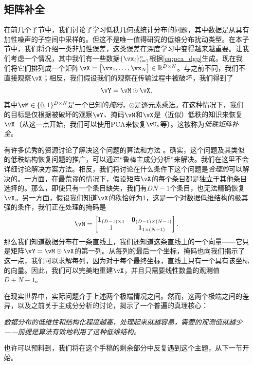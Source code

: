 \documentclass[../../book-main_zh.tex]{subfiles}
\begin{document}
\subsection{矩阵补全}

在前几个子节中，我们讨论了学习低秩几何或统计分布的问题，其中数据是从具有加性噪声的子空间中采样的。但这不是唯一值得研究的低维分布扰动类型。在本子节中，我们将介绍一类非加性误差，这类误差在深度学习中变得越来越重要。让我们考虑一个情况，其中我们有一些数据\(\{\vx_{i}\}_{i = 1}^{n}\)根据\eqref{eq:pca_dgp}生成。现在我们将它们排列成一个矩阵\(\vX = \mat{\vx_{1}, \dots, \vx_{N}} \in \R^{D \times N}\)。与之前不同，我们不直接观察\(\vX\)；相反，我们假设我们的观察在传输过程中被破坏，我们得到了
\begin{equation}
    \vY = \vM \odot \vX,
\end{equation}
其中\(\vM \in \{0, 1\}^{D \times N}\)是一个已知的\textit{掩码}，\(\odot\)是逐元素乘法。在这种情况下，我们的目标是仅根据被破坏的观察\(\vY\)、掩码\(\vM\)和\(\vX\)是（近似）低秩的知识来恢复\(\vX\)（从这一点开始，我们可以使用PCA来恢复\(\vU_{o}\)等）。这被称为\textit{低秩矩阵补全}。

有许多优秀的资源讨论了解决这个问题的算法和方法 \cite{Wright-Ma-2022}。确实，这个问题及其类似的低秩结构恢复问题的推广，可以通过“鲁棒主成分分析”来解决。我们在这里不会详细讨论解决方案方法。相反，我们将讨论在什么条件下这个问题是\textit{合理的}可以解决的。一方面，在最荒谬的情况下，假设矩阵\(\vX\)的每个条目都是独立于其他条目选择的。那么，即使只有一个条目缺失，我们有\(DN - 1\)个条目，也无法精确恢复\(\vX\)。另一方面，假设我们知道\(\vX\)的秩恰好为1，这是一个对数据低维结构的极其强的条件，我们正在处理的掩码是
\begin{equation}
    \vM = \mat{\vone_{(D - 1) \times 1} & \vzero_{(D - 1) \times (N - 1)} \\ 1 & \vone_{1 \times (N - 1)} }.
\end{equation}
那么我们知道数据分布在一条直线上，我们还知道这条直线上的一个向量——它只是矩阵\(\vY = \vM \odot \vX\)的第一列。从每列的最后一个坐标，掩码也向我们揭示了这一点，我们可以求解每列，因为对于每个最终坐标，直线上只有一个具有该坐标的向量。因此，我们可以完美地重建\(\vX\)，并且只需要线性数量的观测值\(D + N - 1\)。

在现实世界中，实际问题介于上述两个极端情况之间。然而，这两个极端之间的差异，以及之前关于主成分分析的讨论，揭示了一个普遍的真理核心：
\begin{tcolorbox}
    \textit{数据分布的低维性和结构化程度越高，处理起来就越容易，需要的观测值就越少——前提是算法有效地利用了这种低维结构。}
\end{tcolorbox}
也许可以预料到，我们将在这个手稿的剩余部分中反复遇到这个主题，从下一节开始。
\end{document}
